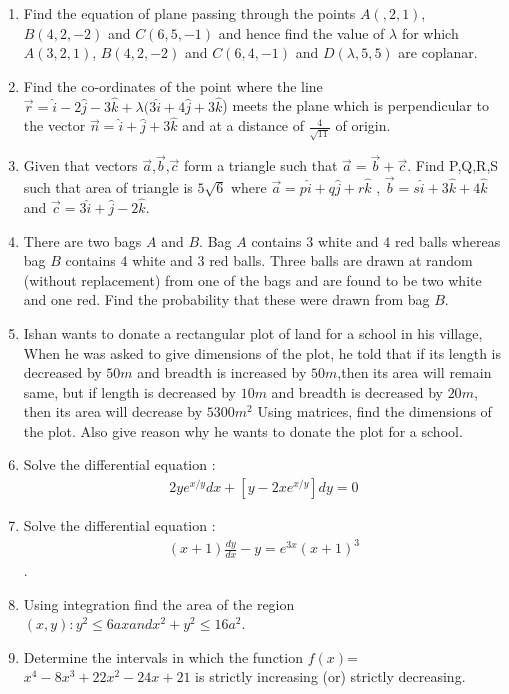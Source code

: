 \documentclass[12pt,-letter paper]{article}
\begin{document}
\begin{enumerate}
\item Find the equation of plane passing through the points $A(,2,1)$, $B(4,2,-2)$ and $C(6,5,-1)$ and hence find the value of $\lambda $ for which $A(3,2,1)$, $B(4,2,-2)$ and $C(6,4,-1)$ and $D(\lambda,5,5)$ are coplanar.
\item Find the co-ordinates of the point where the line $\overrightarrow{r}=\hat{i}-2\hat{j}-3\hat{k}+\lambda(3\hat{i}+4\hat{j}+3\hat{k}$) meets the plane which is perpendicular to the vector $\overrightarrow{n}=\hat{i}+\hat{j}+3\hat{k}$ and at a distance of $\frac{4}{\sqrt{11}}$ of origin.
\item Given that vectors $\overrightarrow{a}$,$\overrightarrow{b}$,$\overrightarrow{c}$ form a triangle such that $\overrightarrow{a}=\overrightarrow{b}+\overrightarrow{c}$. Find P,Q,R,S such that area  of triangle is $5\sqrt{6}$ where $\overrightarrow{a}=p\hat{i}+q\hat{j}+r\hat{k}$ , $\overrightarrow{b}=s\hat{i}+3\hat{k}+4\hat{k}$ and $\overrightarrow{c}=3\hat{i}+\hat{j}-2\hat{k}$. 
\item There are two bags $A$ and $B$. Bag $A$ contains $3$ white and $4$ red balls whereas bag $B$ contains $4$ white and $3$ red balls. Three balls are drawn at random (without replacement) from one of the bags and are found to be two white and one red. Find the probability that these were drawn from bag $B$.
\item Ishan wants to donate a rectangular plot of land for a school in his village, When he was asked to give dimensions of the plot, he told that  if its length is decreased by $50 m$ and breadth is increased by $50 m$,then its area will remain same, but if length is decreased by $10 m$ and breadth is decreased by $20 m$, then its area will decrease by $5300 m^ 2 $  Using matrices, find the dimensions of the plot. Also give reason  why he wants to donate the plot for a school.
\item Solve the differential equation : \begin{align*}2ye^{x/y}dx+[y-2xe^{x/y}]dy=0\end{align*}
\item Solve the differential equation : \begin{align*}(x+1)\frac{dy}{dx}-y=e^{3x}(x+1)^3\end{align*}.
\item Using integration find the area of the region ${(x,y):y^2 \leq 6 ax and x^2+y^2 \leq 16a^2}$.	
\item Determine the intervals in which the function $f(x)$=$x^4-8x^3+22x^2-24x+21$ is strictly increasing (or) strictly decreasing.

\end{enumerate}
\end{document}
